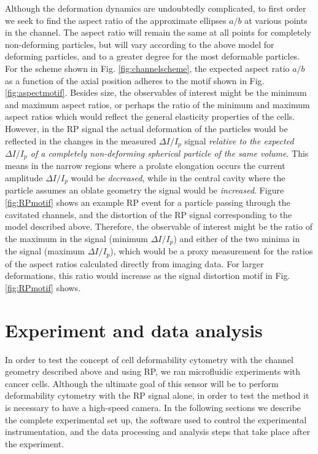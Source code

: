 		Although the deformation dynamics are undoubtedly complicated, to first order we seek to find the aspect ratio of the approximate ellipses $a/b$ at various points in the channel. The aspect ratio will remain the same at all points for completely non-deforming particles, but will vary according to the above model for deforming particles, and to a greater degree for the most deformable particles. For the scheme shown in Fig. \ref{fig:channelscheme}, the expected aspect ratio $a/b$ as a function of the axial position adheres to the motif shown in Fig. \ref{fig:aspectmotif}. Besides size, the observables of interest might be the minimum and maximum aspect ratios, or perhaps the ratio of the minimum and maximum aspect ratios which would reflect the general elasticity properties of the cells. However, in the RP signal the actual deformation of the particles would be reflected in the changes in the measured $\Delta I/I_{p}$ signal \textit{relative to the expected $\Delta I/I_{p}$ of a completely non-deforming spherical particle of the same volume}. This means in the narrow regions where a prolate elongation occurs the current amplitude $\Delta I/I_{p}$ would be \textit{decreased}, while in the central cavity where the particle assumes an oblate geometry the signal would be \textit{increased}. Figure \ref{fig:RPmotif} shows an example RP event for a particle passing through the cavitated channels, and the distortion of the RP signal corresponding to the model described above. Therefore, the observable of interest might be the ratio of the maximum in the signal (minimum $\Delta I/I_{p}$) and either of the two minima in the signal (maximum $\Delta I/I_{p}$), which would be a proxy measurement for the ratios of the aspect ratios calculated directly from imaging data. For larger deformations, this ratio would increase as the signal distortion motif in Fig. \ref{fig:RPmotif} shows.
		
	\section{Experiment and data analysis}

		In order to test the concept of cell deformability cytometry with the channel geometry described above and using RP, we ran microfluidic experiments with cancer cells. Although the ultimate goal of this sensor will be to perform deformability cytometry with the RP signal alone, in order to test the method it is necessary to have a high-speed camera. In the following sections we describe the complete experimental set up, the software used to control the experimental instrumentation, and the data processing and analysis steps that take place after the experiment.
	
